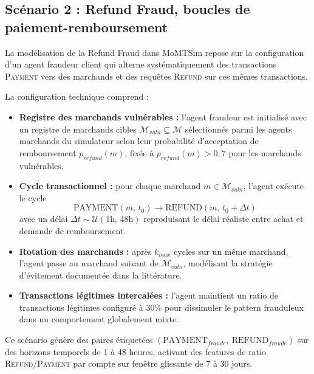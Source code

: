 \documentclass[11pt,a4paper,oneside]{report}
\theoremstyle{definition}
\theoremstyle{remark}
\begin{document}
\subsection{Scénario 2 : Refund Fraud, boucles de paiement-remboursement}

La modélisation de la Refund Fraud dans MoMTSim repose sur la configuration d'un agent fraudeur client qui alterne systématiquement des transactions \textsc{Payment} vers des marchands et des requêtes \textsc{Refund} sur ces mêmes transactions.

La configuration technique comprend :

\begin{itemize}
    \item \textbf{Registre des marchands vulnérables :} l'agent fraudeur est initialisé avec un registre de marchands cibles $\mathcal{M}_{vuln} \subseteq \mathcal{M}$ sélectionnés parmi les agents marchands du simulateur selon leur probabilité d'acceptation de remboursement $p_{refund}(m)$, fixée à $p_{refund}(m) > 0{,}7$ pour les marchands vulnérables.

    \item \textbf{Cycle transactionnel :} pour chaque marchand $m \in \mathcal{M}_{vuln}$, l'agent exécute le cycle
    \begin{equation}
        \text{PAYMENT}(m,\, t_0) \rightarrow \text{REFUND}(m,\, t_0 + \Delta t)
    \end{equation}
    avec un délai $\Delta t \sim \mathcal{U}(1\text{h},\, 48\text{h})$ reproduisant le délai réaliste entre achat et demande de remboursement.

    \item \textbf{Rotation des marchands :} après $k_{max}$ cycles sur un même marchand, l'agent passe au marchand suivant de $\mathcal{M}_{vuln}$, modélisant la stratégie d'évitement documentée dans la littérature.

    \item \textbf{Transactions légitimes intercalées :} l'agent maintient un ratio de transactions légitimes configuré à $30\%$ pour dissimuler le pattern frauduleux dans un comportement globalement mixte.
\end{itemize}

Ce scénario génère des paires étiquetées $(\text{PAYMENT}_{fraude},\ \text{REFUND}_{fraude})$ sur des horizons temporels de 1 à 48 heures, activant des features de ratio \textsc{Refund}/\textsc{Payment} par compte sur fenêtre glissante de 7 à 30 jours.
\end{document}
